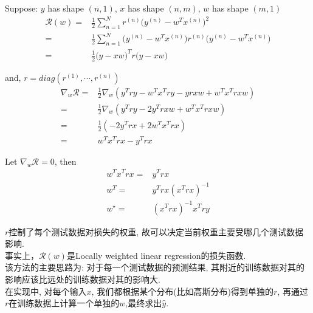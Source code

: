 \documentclass[../main.tex]{subfiles}
\begin{document}
Suppose: $y$ has shape $(n, 1)$, $x$ has shape $(n, m)$, $w$ has shape $(m, 1)$
\begin{align*}
    \mathcal{R}(w)
    = & \frac{1}{2} \sum^N_{n=1} r^{(n)}
        \big( y^{(n)} - w^T x^{(n)} \big)^2 \\
    = & \frac{1}{2} \sum^N_{n=1} \big( y^{(n)} - w^T x^{(n)} \big)
        r^{(n)} \big( y^{(n)} - w^T x^{(n)} \big) \\
    = & \frac{1}{2} \big( y - x w \big)^T
    r \big( y - x w \big)
\end{align*}

and, $r = diag(r^{(1)}, \cdots, r^{(n)})$
\begin{align*}
    \nabla_w \mathcal{R}
    = & \frac{1}{2} \nabla_w (y^T r y - w^T x^T r y
        - y r x w + w^T x^T r x w) \\
    = & \frac{1}{2} \nabla_w (y^T r y - 2 y^T r x w
        + w^T x^T r x w) \\
    = & \frac{1}{2} (- 2 y^T r x + 2 w^T x^T r x) \\
    = & w^T x^T r x - y^T r x       
\end{align*}

Let $\nabla_w \mathcal{R} = 0$, then
\begin{align*}
    w^T x^T r x = & y^T r x \\
            w^T = & y^T r x (x^T r x)^{-1} \\
      w^{\star} = & (x^T r x)^{-1} x^T r y
\end{align*}

$r$控制了每个测试数据对损失的权重, 故可以决定当前权重主要受哪几个测试数据影响.\\
事实上，$\mathcal{R}(w)$是Locally weighted linear regression的损失函数.\\
该方法的主要思路为: 对于每一个测试数据的预测结果, 其附近的训练数据对其的影响应该比远处的训练数据对其的影响大.\\
在实现中, 对每个输入$x$, 我们都根据某个分布(比如高斯分布)得到单独的$r$, 再通过$r$在训练数据上计算一个单独的$w$,最终求出$\hat{y}$.
\end{document}
